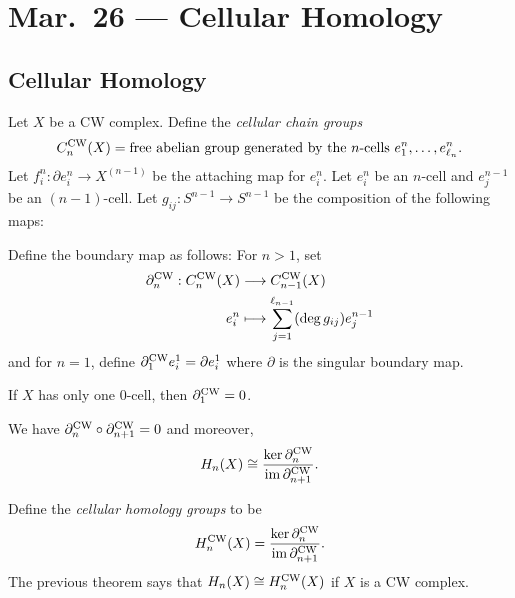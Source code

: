 \chapter{Mar.~26 --- Cellular Homology}

\section{Cellular Homology}

\begin{definition}
  Let $X$ be a CW complex. Define the
  \emph{cellular chain groups}
  \[
    C_n^{\mathrm{CW}}(X) = \text{free abelian group generated by the $n$-cells $e_1^n, \dots, e_{\ell_n}^n$}.
  \]
  Let $f_i^n : \partial e_i^n \to X^{(n - 1)}$ be
  the attaching map for $e_i^n$. Let $e_i^n$ be an
  $n$-cell and $e_j^{n - 1}$ be an $(n - 1)$-cell.
  Let $g_{ij} : S^{n - 1} \to S^{n - 1}$ be
  the composition of the following maps:
  \begin{center}
  \end{center}
  Define the boundary map as follows:
  For $n > 1$, set
  \begin{align*}
    \partial_n^{\mathrm{CW}} : C_n^{\mathrm{CW}}(X)
    &\longrightarrow C_{n - 1}^{\mathrm{CW}}(X) \\
    e_i^n
    &\longmapsto \sum_{j = 1}^{\ell_{n - 1}} (\deg g_{ij}) e_j^{n - 1}
  \end{align*}
  and for $n = 1$, define
  $\partial_1^{\mathrm{CW}} e_i^1 = \partial e_i^1$
  where $\partial$ is the singular boundary map.
\end{definition}

\begin{remark}
  If $X$ has only one $0$-cell, then $\partial_1^{\mathrm{CW}} = 0$.
\end{remark}

\begin{theorem}\label{thm:cell-homology}
  We have $\partial_{n}^{\mathrm{CW}} \circ \partial_{n + 1}^{\mathrm{CW}} = 0$ and moreover,
  \[
    H_n(X) \cong \frac{\ker \partial_n^{\mathrm{CW}}}{\operatorname{im} \partial_{n + 1}^{\mathrm{CW}}}.
  \]
\end{theorem}

\begin{definition}
  Define the \emph{cellular homology groups}
  to be
  \[
    H_n^{\mathrm{CW}}(X) = \frac{\ker \partial_n^{\mathrm{CW}}}{\operatorname{im} \partial_{n + 1}^{\mathrm{CW}}}.
  \]
  The previous theorem says that
  $H_n(X) \cong H_n^{\mathrm{CW}}(X)$ if $X$ is a CW complex.
\end{definition}

